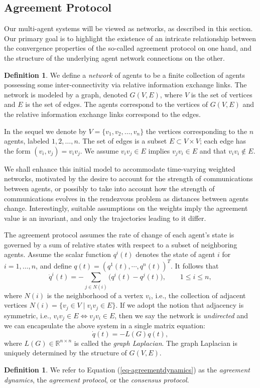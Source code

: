 \documentclass{aims}
\theoremstyle{definition}
\newtheorem{definition}[theorem]{Definition}
\begin{document}
\subsection{Agreement Protocol}
Our multi-agent systems will be viewed as networks, as described in this section. Our primary goal is to highlight the existence of an intricate relationship between the convergence properties of the so-called {agreement protocol} on one hand, and the structure of the underlying agent network connections on the other.
\begin{definition}
We define a {\it network} of agents to be a finite collection of  agents
possessing some inter-connectivity via relative information exchange links. The network is modeled by a graph, denoted
$G(V,E)$, where $V$ is the set of vertices and $E$ is the set of edges.
The agents correspond to the vertices of $G(V,E)$ and the relative information
exchange links correspond to the edges. 
\end{definition}
In the sequel we denote by $V=\{v_1,v_2,\dots,v_n\}$ 
the vertices corresponding to the $n$ agents, labeled $1,2,\dots,n$. The set of edges is a subset
$E\subset V\times V$; each edge has the form $(v_i,v_j)=v_iv_j$.
We assume $v_iv_j\in E$ implies $v_jv_i\in E$ and that $v_iv_i\notin E$.

We shall enhance this initial model to accommodate time-varying weighted networks, motivated by the desire to account for the strength of communications between agents, or possibly to take into account how the strength of communications evolves in the rendezvous problem as distances between agents change.  Interestingly, suitable assumptions on the weights imply the agreement value is an invariant, and only the trajectories leading to it differ.

The agreement protocol assumes the rate of change of each agent's state is governed by a sum of relative
states with respect to a subset of neighboring agents. Assume the scalar function $q^i(t)$ denotes the state of agent $i$ for $i=1,\dots,n$, and define $q(t)=(q^1(t),\cdots,q^n(t))^T$. It follows that   
\begin{equation}
\label{eqqdot1}
\dot{q}^i(t)=-\sum_{j\in N(i)}\big(q^i(t)-q^j(t)\big), \qquad 1\leq i\leq n,
\end{equation}
where $N(i)$ is the neighborhood of a vertex $v_i$, i.e., the collection of adjacent vertices $N(i)=\{v_j\in V \mid v_iv_j\in E\}$. If we adopt the notion that adjacency is symmetric, i.e., $v_iv_j\in E\iff v_jv_i\in E$, then we
say the network is {\it undirected} and we can
encapsulate the above system in a single matrix equation:
\begin{equation}
\label{eq-agreementdynamics}
\dot{q}(t)=-L(G)q(t),
\end{equation}
where $L(G)\in\mathbb{R}^{n\times n}$ is
called the {\it graph Laplacian}.
The graph Laplacian is uniquely determined by the structure of $G(V,E)$.
\begin{definition}
We refer to Equation (\ref{eq-agreementdynamics}) as the \emph{agreement dynamics}, the \emph{agreement protocol}, or the \emph{consensus protocol}.
\end{definition}
\end{document}
